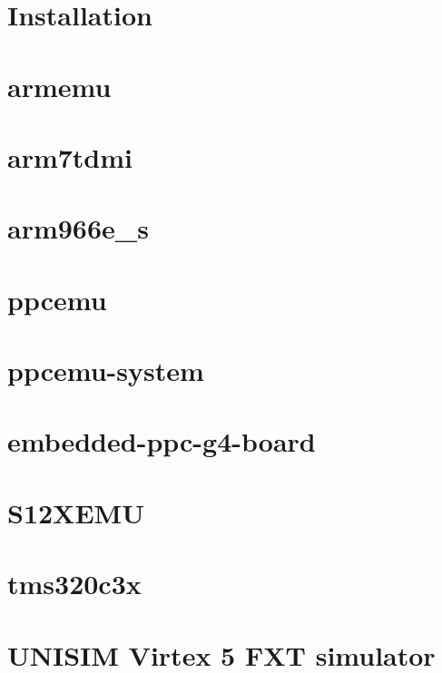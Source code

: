 \documentclass[a4paper,11pt,onecolumn]{mathese}
\begin{document}
\chapter{Installation}
\label{installation}


\chapter{armemu}
\label{armemu}


\chapter{arm7tdmi}
\label{arm7tdmi}


\chapter{arm966e\_s}
\label{arm966e_s}


\chapter{ppcemu}
\label{ppcemu}


\chapter{ppcemu-system}
\label{ppcemu_system}


\chapter{embedded-ppc-g4-board}
\label{embedded_ppc_g4_board}


\chapter{S12XEMU}
\label{S12XEMU}


\chapter{tms320c3x}
\label{tms320c3x}


\chapter{UNISIM Virtex 5 FXT simulator}
\label{virtex5fxt}

\end{document}
